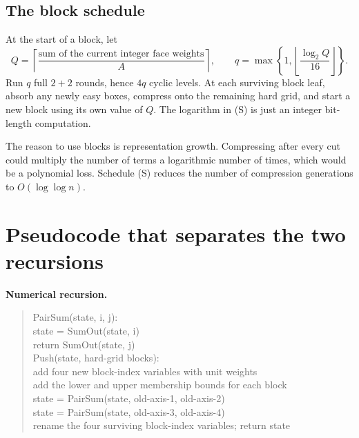 \documentclass[12pt,a4paper]{article}
\theoremstyle{remark}
\newcommand{\1}{\mathbf1}
\begin{document}
\subsection{The block schedule}
At the start of a block, let
\[
 Q=\left\lceil\frac{\text{sum of the current integer face weights}}{A}\right\rceil,
 \qquad
 q=\max\left\{1,\left\lfloor\frac{\log_2 Q}{16}\right\rfloor\right\}.
                                                        \tag{S}
\]
Run $q$ full $2+2$ rounds, hence $4q$ cyclic levels. At each surviving
block leaf, absorb any newly easy boxes, compress onto the remaining hard
grid, and start a new block using its own value of $Q$.
The logarithm in (S) is just an integer bit-length computation.

The reason to use blocks is representation growth. Compressing after every
cut could multiply the number of terms a logarithmic number of times,
which would be a polynomial loss. Schedule (S) reduces the number of
compression generations to $O(\log\log n)$.

\section{Pseudocode that separates the two recursions}\label{sec:pseudo}
\noindent\textbf{Numerical recursion.}
\begin{quote}\ttfamily\small
PairSum(state, i, j):\\
\hspace*{1em}state = SumOut(state, i)\\
\hspace*{1em}return SumOut(state, j)\\[.5em]
Push(state, hard-grid blocks):\\
\hspace*{1em}add four new block-index variables with unit weights\\
\hspace*{1em}add the lower and upper membership bounds for each block\\
\hspace*{1em}state = PairSum(state, old-axis-1, old-axis-2)\\
\hspace*{1em}state = PairSum(state, old-axis-3, old-axis-4)\\
\hspace*{1em}rename the four surviving block-index variables; return state
\end{quote}
\end{document}
